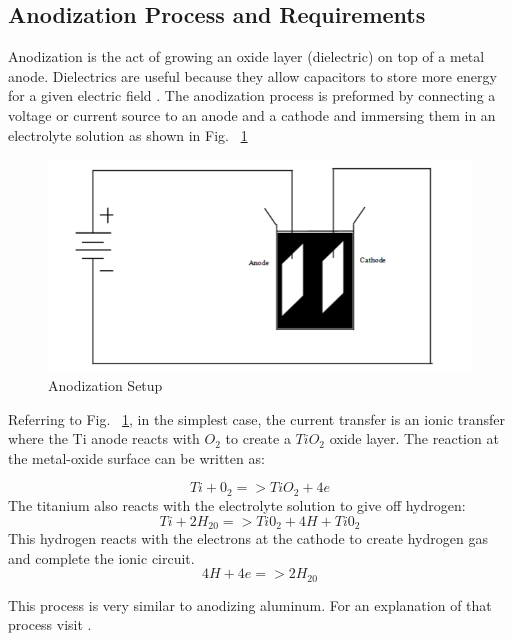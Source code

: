 \documentclass[journal]{IEEEtran}
\begin{document}
\subsection{Anodization Process and Requirements}

Anodization is the act of growing an oxide layer (dielectric) on top of a metal anode. Dielectrics are useful because they allow capacitors to store more energy for a given electric field \cite{cwruEncDie}. The anodization process is preformed by connecting a voltage or current source to an anode and a cathode and immersing them in an electrolyte solution as shown in Fig. ~\ref{fig:anodSetup}

\begin{figure}[here]
\centering
\includegraphics{anodSetup}
\caption{Anodization Setup}
\label{fig:anodSetup}
\end{figure}


Referring to Fig. ~\ref{fig:anodSetup}, in the simplest case, the current transfer is an ionic transfer where the Ti anode reacts with $O_{2}$ to create a $TiO_{2}$ oxide layer. The reaction at the metal-oxide surface can be written as:

\begin{equation}
Ti + 0_2 => TiO_2 + 4e
\end{equation}
The titanium also reacts with the electrolyte solution to give off hydrogen:
\begin{equation}
Ti + 2H_20 => Ti0_2 + 4H+Ti0_2
\end{equation}
This hydrogen reacts with the electrons at the cathode to create hydrogen gas and complete the ionic circuit.
\begin{equation}
4H + 4e => 2H_20
\end{equation}

This process is very similar to anodizing aluminum. For an explanation of that process visit \cite{cwruEncAlanod}.
\end{document}
